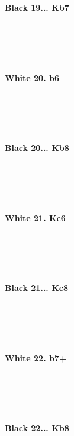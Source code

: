 \documentclass{article}
\begin{document}
\\
\\
\\

\\
\\
\textbf{Black 19... Kb7}\\
\\
\\
\\

\\
\\
\textbf{White 20. b6}\\
\\
\\
\\

\\
\\
\textbf{Black 20... Kb8}\\
\\
\\
\\

\\
\\
\textbf{White 21. Kc6}\\
\\
\\
\\

\\
\\
\textbf{Black 21... Kc8}\\
\\
\\
\\

\\
\\
\textbf{White 22. b7+}\\
\\
\\
\\

\\
\\
\textbf{Black 22... Kb8}\\
\end{document}
